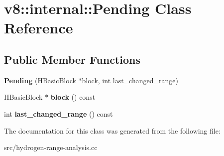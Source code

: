 \hypertarget{classv8_1_1internal_1_1_pending}{}\section{v8\+:\+:internal\+:\+:Pending Class Reference}
\label{classv8_1_1internal_1_1_pending}
\subsection*{Public Member Functions}
\begin{DoxyCompactItemize}
\item 
\hypertarget{classv8_1_1internal_1_1_pending_aa8c2332f59eb008539156e85ba7f8cbf}{}{\bfseries Pending} (H\+Basic\+Block $\ast$block, int last\+\_\+changed\+\_\+range)\label{classv8_1_1internal_1_1_pending_aa8c2332f59eb008539156e85ba7f8cbf}

\item 
\hypertarget{classv8_1_1internal_1_1_pending_a83ddbe587f4c6c8bb2cf1c12e9700fd3}{}H\+Basic\+Block $\ast$ {\bfseries block} () const \label{classv8_1_1internal_1_1_pending_a83ddbe587f4c6c8bb2cf1c12e9700fd3}

\item 
\hypertarget{classv8_1_1internal_1_1_pending_a9a64273a6d65131d45cf8b2a4d20e5c7}{}int {\bfseries last\+\_\+changed\+\_\+range} () const \label{classv8_1_1internal_1_1_pending_a9a64273a6d65131d45cf8b2a4d20e5c7}

\end{DoxyCompactItemize}


The documentation for this class was generated from the following file\+:\begin{DoxyCompactItemize}
\item 
src/hydrogen-\/range-\/analysis.\+cc\end{DoxyCompactItemize}
